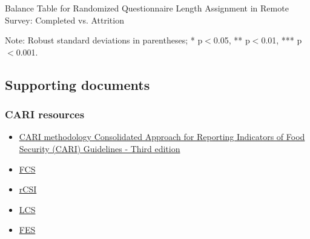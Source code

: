 \documentclass[11pt,harvard]{article}
\begin{document}
	\begin{table}[htbp]
		\centering
		\begin{adjustbox}{max width=\textwidth}
			\begin{threeparttable}
				\caption{Balance Table for Randomized Questionnaire Length Assignment in Remote Survey: Completed vs. Attrition}
				\scriptsize
				 
				\label{tab:BF_Listing_Demo_Attrition_Remote}
				\begin{tablenotes}
					\item Note: Robust standard deviations in parentheses; * p$<$0.05, ** p$<$0.01, *** p$<$0.001.
				\end{tablenotes}
			\end{threeparttable}
		\end{adjustbox}
	\end{table}
	
	\pagebreak
	
	\pagebreak
	
	\subsection{Supporting documents}
	\subsubsection{CARI resources}
	\begin{itemize}
		\item \href{https://resources.vam.wfp.org/data-analysis/quantitative/food-security/cari}{CARI methodology Consolidated Approach for Reporting Indicators of Food Security (CARI) Guidelines - Third edition}
		\item \href{https://resources.vam.wfp.org/data-analysis/quantitative/food-security/food-consumption-score}{FCS}
		\item \href{https://resources.vam.wfp.org/data-analysis/quantitative/food-security/reduced-coping-strategies-index}{rCSI}
		\item \href{https://resources.vam.wfp.org/data-analysis/quantitative/food-security/livelihood-coping-strategies-food-security}{LCS}
		\item \href{https://resources.vam.wfp.org/data-analysis/quantitative/food-security/food-expenditure-share}{FES}
	\end{itemize} 
	
\end{document}
